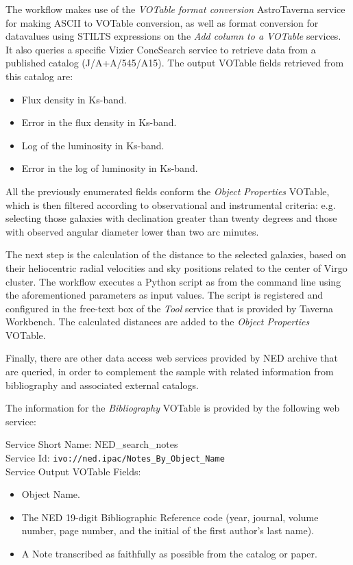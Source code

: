 \documentclass{aa}
\begin{document}
The workflow makes use of the \textit{VOTable format conversion} AstroTaverna service for making ASCII to VOTable conversion, as well as format conversion for datavalues using STILTS expressions on the \textit{Add column to a VOTable} services. It also queries a specific Vizier ConeSearch service to retrieve data from a published catalog (J/A+A/545/A15). The output VOTable fields retrieved from this catalog are:

\begin{itemize}
\item Flux density in Ks-band. 
\item Error in the flux density in Ks-band.
\item Log of the luminosity in Ks-band.
\item Error in the log of luminosity in Ks-band.
\end{itemize}

All the previously enumerated fields conform the \textit{Object Properties} VOTable, which is then filtered according to observational and instrumental criteria: e.g. selecting those galaxies with declination greater than twenty degrees and those with observed angular diameter lower than two arc minutes. 

The next step is the calculation of the distance to the selected galaxies, based on their heliocentric radial velocities and sky positions related to the center of Virgo cluster. The workflow executes a Python script as from the command line using the aforementioned parameters as input values. The script is registered and configured in the free-text box of the \textit{Tool} service that is provided by Taverna Workbench. The calculated distances are added to the \textit{Object Properties} VOTable. 

Finally, there are other data access web services provided by NED archive that are queried, in order to complement the sample with related information from bibliography and associated external catalogs. 

The information for the \textit{Bibliography} VOTable is provided by the following web service:

\begin{minipage}[h]{0.9\columnwidth}
  \small \vspace{\baselineskip}
\noindent Service Short Name: NED\_search\_notes\\
Service Id: \texttt{ivo://ned.ipac/Notes\_By\_Object\_Name}\\
Service Output VOTable Fields:
\begin{itemize}
\item Object Name.
\item The NED 19-digit Bibliographic Reference code (year, journal, volume number, page number, and the initial of the first author's last name).
\item A Note transcribed as faithfully as possible from the catalog or paper.
\end{itemize}
\vspace{\baselineskip}
\end{minipage}
\end{document}

